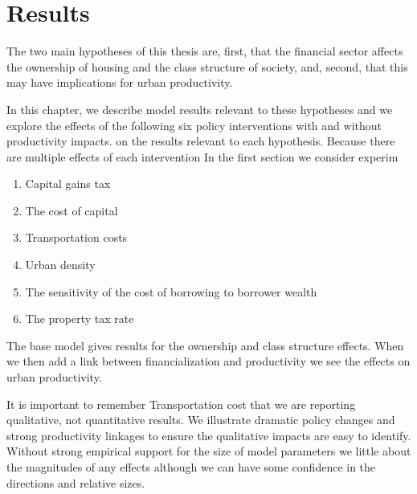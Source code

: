 \chapter{Results} \label{chapter-results}

The two main hypotheses of this thesis are, first, that the financial sector affects the ownership of housing and the class structure of society, and, second, that this may have implications for urban productivity.  


In this chapter, we describe model results relevant to these hypotheses and we explore the effects of the following six policy interventions with and without productivity impacts. on the results relevant to each hypothesis.  Because there are multiple effects of each intervention In the first section we consider experim 

\begin{enumerate}
\item Capital gains tax
\item The cost of capital
\item Transportation costs
\item Urban density
\item The sensitivity of the cost of borrowing to borrower wealth
\item The property tax rate
\end{enumerate}

The base model gives results for the ownership and class structure effects. When we then add a link between financialization and productivity we see the effects on urban productivity. 

It is important to remember Transportation cost that we are reporting qualitative, not quantitative results. We illustrate dramatic policy changes and strong productivity linkages to ensure the qualitative impacts are easy to identify. Without strong empirical support for the size of model parameters we little about the magnitudes of any effects although we can have some confidence in the directions and relative sizes.  



